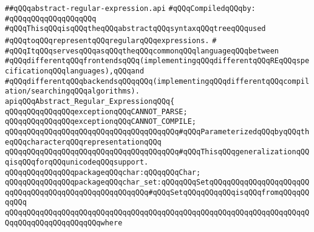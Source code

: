 \label{src/lib/regex/front/abstract-regular-expression.api}
\verb|##qQQqabstract-regular-expression.api|\newline
\newline
\verb|#qQQqCompiledqQQqby:|\newline
\verb|#qQQqqQQqqQQqqQQqqQQq|\newline
\newline
\verb|#qQQqThisqQQqisqQQqtheqQQqabstractqQQqsyntaxqQQqtreeqQQqused|\newline
\verb|#qQQqtoqQQqrepresentqQQqregularqQQqexpressions.|\newline
\verb|#|\newline
\verb|#qQQqItqQQqservesqQQqasqQQqtheqQQqcommonqQQqlanguageqQQqbetween|\newline
\verb|#qQQqdifferentqQQqfrontendsqQQq(implementingqQQqdifferentqQQqREqQQqspecificationqQQqlanguages),qQQqand|\newline
\verb|#qQQqdifferentqQQqbackendsqQQqqQQq(implementingqQQqdifferentqQQqcompilation/searchingqQQqalgorithms).|\newline
\newline
\newline
\verb|apiqQQqAbstract_Regular_ExpressionqQQq{|\newline
\newline
\verb|qQQqqQQqqQQqqQQqexceptionqQQqCANNOT_PARSE;|\newline
\verb|qQQqqQQqqQQqqQQqexceptionqQQqCANNOT_COMPILE;|\newline
\newline
\verb|qQQqqQQqqQQqqQQqqQQqqQQqqQQqqQQqqQQqqQQq#qQQqParameterizedqQQqbyqQQqtheqQQqcharacterqQQqrepresentationqQQq|\newline
\verb|qQQqqQQqqQQqqQQqqQQqqQQqqQQqqQQqqQQqqQQq#qQQqThisqQQqgeneralizationqQQqisqQQqforqQQqunicodeqQQqsupport.|\newline
\newline
\verb|qQQqqQQqqQQqqQQqpackageqQQqchar:qQQqqQQqChar;|\newline
\newline
\verb|qQQqqQQqqQQqqQQqpackageqQQqchar_set:qQQqqQQqSetqQQqqQQqqQQqqQQqqQQqqQQqqQQqqQQqqQQqqQQqqQQqqQQqqQQqqQQq#qQQqSetqQQqqQQqqQQqisqQQqfromqQQqqQQqqQQq|\newline
\verb|qQQqqQQqqQQqqQQqqQQqqQQqqQQqqQQqqQQqqQQqqQQqqQQqqQQqqQQqqQQqqQQqqQQqqQQqqQQqqQQqqQQqqQQqqQQqwhere|\newline
